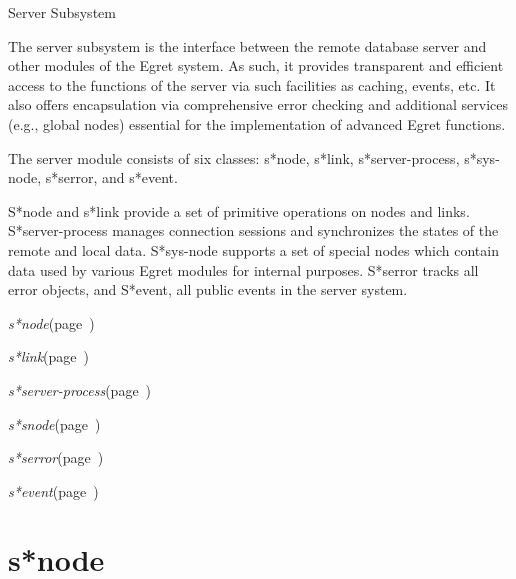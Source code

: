 \begin{description}
\item [Name:]  Server Subsystem

\item [Description:]
The server subsystem is the interface between the remote
database server and other modules of the Egret system. As
such, it provides transparent and efficient access to the
functions of the server via such facilities as caching,
events, etc. It also offers encapsulation via
comprehensive error checking and additional services
(e.g., global nodes) essential for the implementation of
advanced Egret functions.

The server module consists of six classes: s*node, s*link,
s*server-process, s*sys-node, s*serror, and s*event.

S*node and s*link provide a set of primitive operations
on nodes and links.  S*server-process manages connection
sessions and synchronizes the states of the remote and
local data.  S*sys-node supports a set of special nodes
which contain data used by various Egret modules for
internal purposes.  S*serror tracks all error objects,
and S*event, all public events in the server system.

\item [Public-classes:]
\item {\sl s*node}\hfill(page~\pageref{s*node})
\item {\sl s*link}\hfill(page~\pageref{s*link})
\item {\sl s*server-process}\hfill(page~\pageref{s*server-process})
\item {\sl s*snode}\hfill(page~\pageref{s*snode})
\item {\sl s*serror}\hfill(page~\pageref{s*serror})
\item {\sl s*event}\hfill(page~\pageref{s*event})  

\item [Private-classes:]




\end{description}
\horizontalline

\section{s*node}
\label{s*node}

